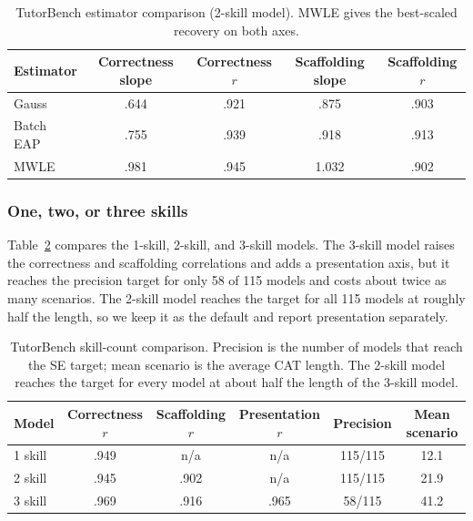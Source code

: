 \begin{table}[t]
  \centering
  \caption{TutorBench estimator comparison (2-skill model). MWLE gives the
    best-scaled recovery on both axes.}
  \label{tab:tb-estimator}
  \begin{tabular}{lcccc}
    \toprule
    Estimator & Correctness slope & Correctness $r$ & Scaffolding slope & Scaffolding $r$ \\
    \midrule
    Gauss     & .644 & .921 & .875 & .903 \\
    Batch EAP & .755 & .939 & .918 & .913 \\
    MWLE      & .981 & .945 & 1.032 & .902 \\
    \bottomrule
  \end{tabular}
\end{table}

\subsubsection{One, two, or three skills}
Table~\ref{tab:tb-skills} compares the 1-skill, 2-skill, and 3-skill models. The
3-skill model raises the correctness and scaffolding correlations and adds a
presentation axis, but it reaches the precision target for only 58 of 115 models
and costs about twice as many scenarios. The 2-skill model reaches the target
for all 115 models at roughly half the length, so we keep it as the default and
report presentation separately.

\begin{table}[t]
  \centering
  \caption{TutorBench skill-count comparison. Precision is the number of models
    that reach the SE target; mean scenario is the average CAT length. The
    2-skill model reaches the target for every model at about half the length of
    the 3-skill model.}
  \label{tab:tb-skills}
  \begin{tabular}{lccc c c}
    \toprule
    Model & Correctness $r$ & Scaffolding $r$ & Presentation $r$ & Precision & Mean scenario \\
    \midrule
    1 skill & .949 & n/a  & n/a  & 115/115 & 12.1 \\
    2 skill & .945 & .902 & n/a  & 115/115 & 21.9 \\
    3 skill & .969 & .916 & .965 & 58/115  & 41.2 \\
    \bottomrule
  \end{tabular}
\end{table}

